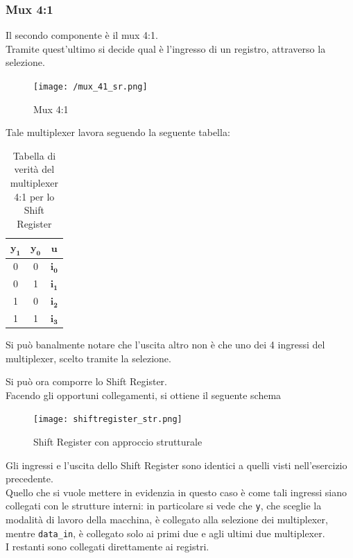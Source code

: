 \subsubsection{Mux 4:1}
Il secondo componente è il mux 4:1.\\
Tramite quest'ultimo si decide qual è l'ingresso di un registro, attraverso la selezione.\\
\begin{figure}[H]
	\centering
	\texttt{[image: /mux\_41\_sr.png]}
	\caption{Mux 4:1}
	\label{mux_41_sr} 
\end{figure}
\noindent Tale multiplexer lavora seguendo la seguente tabella:
\begin{table}[h!]
    \centering
    \begin{tabular}{||c|c||c||}
        \hline
        \hline
        $\mathbf{y_1}$ & $\mathbf{y_0}$ & $\mathbf{u}$ \\
        \hline
        0 & 0 & $\mathbf{i_0}$ \\
        \hline
        0 & 1 & $\mathbf{i_1}$ \\
        \hline
        1 & 0 & $\mathbf{i_2}$ \\
        \hline
        1 & 1 & $\mathbf{i_3}$ \\
        \hline
        \hline 
    \end{tabular}
    \caption{Tabella di verità del multiplexer 4:1 per lo Shift Register}
    \label{tab:mux_4:1_sr}
\end{table}
Si può banalmente notare che l'uscita altro non è che uno dei 4 ingressi del multiplexer, scelto tramite la selezione.

Si può ora comporre lo Shift Register.\\
Facendo gli opportuni collegamenti, si ottiene il seguente schema
\begin{figure}[H]
	\centering
	\texttt{[image: shiftregister\_str.png]}
	\caption{Shift Register con approccio strutturale}
	\label{mux_41_sr} 
\end{figure}
Gli ingressi e l'uscita dello Shift Register sono identici a quelli visti nell'esercizio precedente.\\
Quello che si vuole mettere in evidenzia in questo caso è come tali ingressi siano collegati con le strutture interni: in particolare si vede che \texttt{y}, che sceglie la modalità di lavoro della macchina, è collegato alla selezione dei multiplexer, mentre \texttt{data\_in}, è collegato solo ai primi due e agli ultimi due multiplexer.\\
I restanti sono collegati direttamente ai registri.

